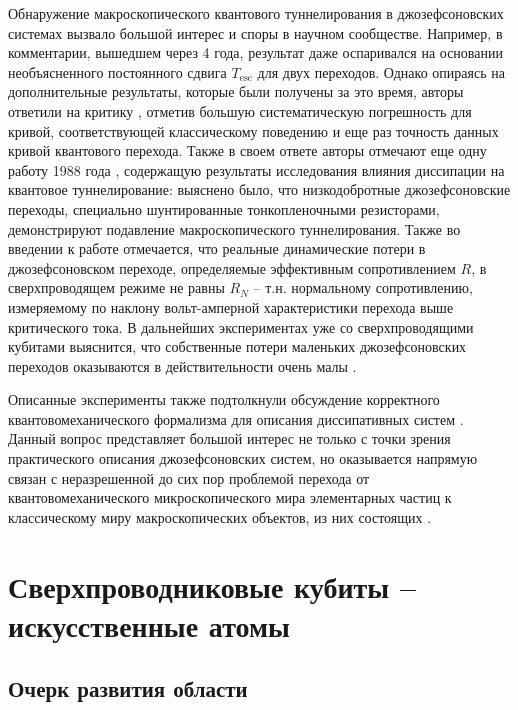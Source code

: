 \documentclass[14pt, a4paper]{extreport}
\numberwithin{equation}{section}
\begin{document}
Обнаружение макроскопического квантового туннелирования в джозефсоновских системах вызвало большой интерес и споры в научном сообществе. Например, в комментарии, вышедшем через 4 года\cite{silvestrini1989comment}, результат даже оспаривался на основании необъясненного постоянного сдвига $T_\text{esc}$ для двух переходов. Однако опираясь на дополнительные результаты, которые были получены за это время, авторы ответили на критику \cite{devoret1989devoret}, отметив большую систематическую погрешность для кривой, соответствующей классическому поведению и еще раз точность данных кривой квантового перехода. Также в своем ответе авторы отмечают еще одну работу 1988 года \cite{cleland1988measurement}, содержащую результаты исследования влияния диссипации на квантовое туннелирование: выяснено было, что низкодобротные джозефсоновские переходы, специально шунтированные тонкопленочными резисторами, демонстрируют подавление макроскопического туннелирования. Также во введении к работе отмечается, что реальные динамические потери в джозефсоновском переходе, определяемые эффективным сопротивлением $R$, в сверхпроводящем режиме не  равны $R_N$ -- т.н. нормальному сопротивлению, измеряемому по наклону вольт-амперной характеристики перехода выше критического тока. В дальнейших экспериментах уже со сверхпроводящими кубитами выяснится, что собственные потери маленьких джозефсоновских переходов оказываются в действительности очень малы \cite{paik2011observation}.

Описанные эксперименты также подтолкнули обсуждение корректного квантовомеханического формализма для описания диссипативных систем \cite{caldeira1985influence, walls1985effect}. Данный вопрос представляет большой интерес не только с точки зрения практического описания джозефсоновских систем, но оказывается напрямую связан с неразрешенной до сих пор проблемой перехода от квантовомеханического микроскопического мира элементарных частиц к классическому миру макроскопических объектов, из них состоящих \cite{walls1985analysis, zurek2009quantum}.



\section{Сверхпроводниковые кубиты -- искусственные атомы}

\subsection{Очерк развития области}
\end{document}
